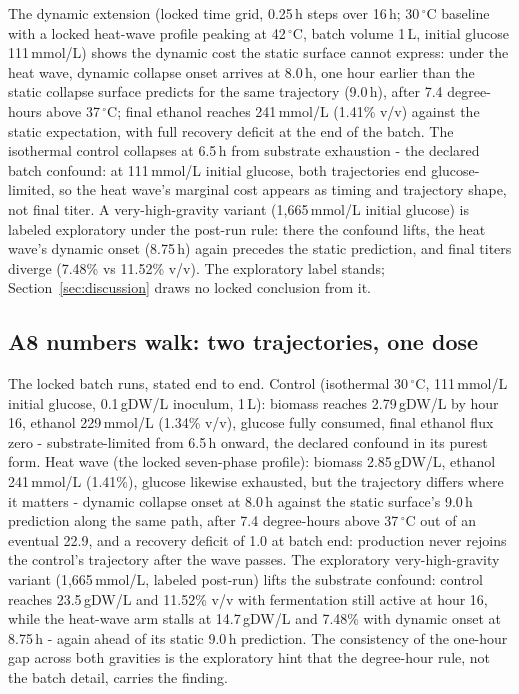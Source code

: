 \documentclass[12pt]{article}
\begin{document}
The dynamic extension (locked time grid, 0.25\,h steps over 16\,h;
30\,$^{\circ}$C baseline with a locked heat-wave profile peaking at
42\,$^{\circ}$C, batch volume 1\,L, initial glucose 111\,mmol/L)
shows the dynamic cost the static surface cannot express: under the
heat wave, dynamic collapse onset arrives at 8.0\,h, one hour earlier
than the static collapse surface predicts for the same trajectory
(9.0\,h), after 7.4 degree-hours above 37\,$^{\circ}$C; final ethanol
reaches 241\,mmol/L (1.41\% v/v) against the static expectation, with
full recovery deficit at the end of the batch. The isothermal control
collapses at 6.5\,h from substrate exhaustion - the declared batch
confound: at 111\,mmol/L initial glucose, both trajectories end
glucose-limited, so the heat wave's marginal cost appears as timing
and trajectory shape, not final titer. A very-high-gravity variant
(1{,}665\,mmol/L initial glucose) is labeled exploratory under the
post-run rule: there the confound lifts, the heat wave's dynamic onset
(8.75\,h) again precedes the static prediction, and final titers
diverge (7.48\% vs 11.52\% v/v). The exploratory label stands;
Section~\ref{sec:discussion} draws no locked conclusion from it.



\subsection{A8 numbers walk: two trajectories, one dose}

The locked batch runs, stated end to end. Control (isothermal
30\,$^{\circ}$C, 111\,mmol/L initial glucose, 0.1\,gDW/L inoculum,
1\,L): biomass reaches 2.79\,gDW/L by hour 16, ethanol 229\,mmol/L
(1.34\% v/v), glucose fully consumed, final ethanol flux zero -
substrate-limited from 6.5\,h onward, the declared confound in its
purest form. Heat wave (the locked seven-phase profile): biomass
2.85\,gDW/L, ethanol 241\,mmol/L (1.41\%), glucose likewise
exhausted, but the trajectory differs where it matters - dynamic
collapse onset at 8.0\,h against the static surface's 9.0\,h
prediction along the same path, after 7.4 degree-hours above
37\,$^{\circ}$C out of an eventual 22.9, and a recovery deficit of
1.0 at batch end: production never rejoins the control's trajectory
after the wave passes. The exploratory very-high-gravity variant
(1{,}665\,mmol/L, labeled post-run) lifts the substrate confound:
control reaches 23.5\,gDW/L and 11.52\% v/v with fermentation still
active at hour 16, while the heat-wave arm stalls at 14.7\,gDW/L and
7.48\% with dynamic onset at 8.75\,h - again ahead of its static
9.0\,h prediction. The consistency of the one-hour gap across both
gravities is the exploratory hint that the degree-hour rule, not the
batch detail, carries the finding.
\end{document}
